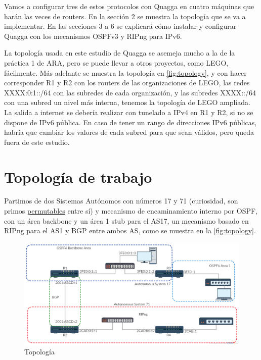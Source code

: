\documentclass{article}
\begin{document}
Vamos a configurar tres de estos protocolos con Quagga en cuatro máquinas que harán las veces de routers.
En la sección 2 se muestra la topología que se va a implementar. En las secciones 3 a 6 se explicará cómo instalar y configurar Quagga con los mecanismos OSPFv3 y RIPng para IPv6.

La topología usada en este estudio de Quagga se asemeja mucho a la de la práctica 1 de ARA, pero se puede llevar a otros proyectos, como LEGO, fácilmente. Más adelante se muestra la topología en \autoref{fig:topology}, y con hacer corresponder R1 y R2 con los routers de las organizaciones de LEGO, las redes XXXX:0:1::/64 con las subredes de cada organización, y las subredes XXXX::/64 con una subred un nivel más interna, tenemos la topología de LEGO ampliada. La salida a internet se debería realizar con tunelado a IPv4 en R1 y R2, si no se dispone de IPv6 pública. En caso de tener un rango de direcciones IPv6 públicas, habría que cambiar los valores de cada subred para que sean válidos, pero queda fuera de este estudio.

\section{Topología de trabajo}


Partimos de dos Sistemas Autónomos con números 17 y 71 (curiosidad, son primos \hyperref{https://en.wikipedia.org/wiki/Permutable_prime}{}{}{\underline{permutables}}  entre sí) y mecanismo de encaminamiento interno por OSPF, con un área backbone y un área 1 stub para el AS17, un mecanismo basado en RIPng para el AS1 y BGP entre ambos AS, como se muestra en la \autoref{fig:topology}.


\begin{figure}[!h]
	\centering
	\includegraphics[scale=0.29]{images/Topology.png}
	\caption{Topología}
	\label{fig:topology}
\end{figure}
\end{document}
